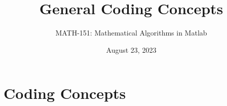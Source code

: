 {}\documentclass[letterpaper,
compress,
xcolor=x11names,
]{beamer}
\begin{document}
	\title{General Coding Concepts}
	\author{MATH-151:  Mathematical Algorithms in Matlab}
	\date[202X]{August 23, 2023}




\begin{frame}
\titlepage
\end{frame}
\section{Coding Concepts}
\end{document}
